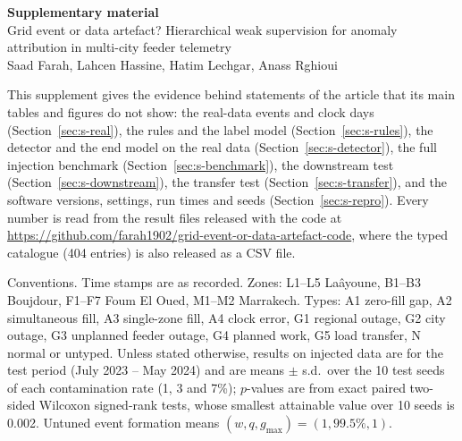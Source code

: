 \documentclass[11pt,a4paper]{article}
\begin{document}
\begin{center}
{\Large\bfseries Supplementary material}\\[6pt]
{\large Grid event or data artefact? Hierarchical weak supervision for anomaly attribution in multi-city feeder telemetry}\\[8pt]
Saad Farah, Lahcen Hassine, Hatim Lechgar, Anass Rghioui
\end{center}

This supplement gives the evidence behind statements of the article that its main tables and figures do not show: the
real-data events and clock days (Section~\ref{sec:s-real}), the rules and the label model (Section~\ref{sec:s-rules}),
the detector and the end model on the real data (Section~\ref{sec:s-detector}), the full injection benchmark
(Section~\ref{sec:s-benchmark}), the downstream test (Section~\ref{sec:s-downstream}), the transfer test
(Section~\ref{sec:s-transfer}), and the software versions, settings, run times and seeds (Section~\ref{sec:s-repro}).
Every number is read from the result files released with the code at \url{https://github.com/farah1902/grid-event-or-data-artefact-code}, where the typed catalogue
(404 entries) is also released as a CSV file.

Conventions. Time stamps are as recorded. Zones: L1--L5 La\^ayoune, B1--B3 Boujdour, F1--F7 Foum El Oued, M1--M2 Marrakech.
Types: A1 zero-fill gap, A2 simultaneous fill, A3 single-zone fill, A4 clock error, G1 regional outage, G2 city outage,
G3 unplanned feeder outage, G4 planned work, G5 load transfer, N normal or untyped. Unless stated otherwise, results on
injected data are for the test period (July 2023 -- May 2024) and are means $\pm$ s.d.\ over the 10 test seeds of each
contamination rate (1, 3 and 7\%); $p$-values are from exact paired two-sided Wilcoxon signed-rank tests, whose smallest
attainable value over 10 seeds is 0.002. Untuned event formation means $(w, q, g_{\max}) = (1, 99.5\%, 1)$.

\tableofcontents
\end{document}
